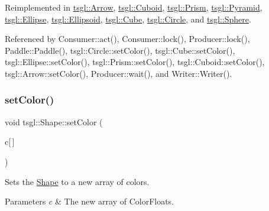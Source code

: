 Reimplemented in \hyperlink{classtsgl_1_1_arrow_a4eabf87c29f3da697fe39006c45510b7}{tsgl\+::\+Arrow}, \hyperlink{classtsgl_1_1_cuboid_a683f0eeb463e9779e954955f92f12f8e}{tsgl\+::\+Cuboid}, \hyperlink{classtsgl_1_1_prism_af2c681fd9cf74eaede3dd4fd8dd10625}{tsgl\+::\+Prism}, \hyperlink{classtsgl_1_1_pyramid_aef16d8830e2dfac0e8a30d091d099c30}{tsgl\+::\+Pyramid}, \hyperlink{classtsgl_1_1_ellipse_afb71964e56fdd50e49ba46e8090aa858}{tsgl\+::\+Ellipse}, \hyperlink{classtsgl_1_1_ellipsoid_afc2fc98057e5d19d8fa0c45f07273cdb}{tsgl\+::\+Ellipsoid}, \hyperlink{classtsgl_1_1_cube_a4eb42afdc453fa0c768924a26e5cd870}{tsgl\+::\+Cube}, \hyperlink{classtsgl_1_1_circle_a3e97ff653a534a606f0a3b3176c330b0}{tsgl\+::\+Circle}, and \hyperlink{classtsgl_1_1_sphere_aa0870a70e34c6c77e2d61e50dbf3cc07}{tsgl\+::\+Sphere}.



Referenced by Consumer\+::act(), Consumer\+::lock(), Producer\+::lock(), Paddle\+::\+Paddle(), tsgl\+::\+Circle\+::set\+Color(), tsgl\+::\+Cube\+::set\+Color(), tsgl\+::\+Ellipse\+::set\+Color(), tsgl\+::\+Prism\+::set\+Color(), tsgl\+::\+Cuboid\+::set\+Color(), tsgl\+::\+Arrow\+::set\+Color(), Producer\+::wait(), and Writer\+::\+Writer().

\mbox{\label{classtsgl_1_1_shape_ad7e554b5d4cea111ec518548b9f21388}} 
\subsubsection{\texorpdfstring{set\+Color()}{setColor()}\hspace{0.1cm}{\footnotesize\ttfamily [2/2]}}
{\footnotesize\ttfamily void tsgl\+::\+Shape\+::set\+Color (\begin{DoxyParamCaption}\item[{\hyperlink{structtsgl_1_1_color_float}{Color\+Float}}]{c\mbox{[}$\,$\mbox{]} }\end{DoxyParamCaption})\hspace{0.3cm}{\ttfamily [virtual]}}



Sets the \hyperlink{classtsgl_1_1_shape}{Shape} to a new array of colors. 


\begin{DoxyParams}{Parameters}
{\em c} & The new array of Color\+Floats. \\
\hline
\end{DoxyParams}


